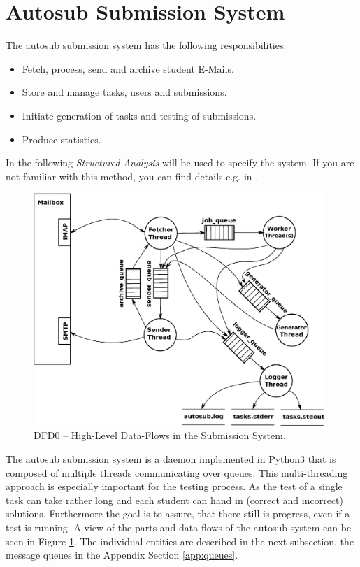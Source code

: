 \section{Autosub Submission System} \label{autosub_system}

The autosub submission system has the following responsibilities:
\begin{itemize}
    \item Fetch, process, send and archive student E-Mails.
    \item Store and manage tasks, users and submissions.
    \item Initiate generation of tasks and testing of submissions.
    \item Produce statistics.
\end{itemize}

In the following {\it Structured Analysis} will be used to specify the
system. If you are not familiar with this method, you can find details e.g. in
\cite{demarco, gooma, cooling}.

\begin{figure}[h!]
    \begin{center}
    \includegraphics[width=11cm]{images/autosub_structure.eps}
    \caption{DFD0 -- High-Level Data-Flows in the Submission System.}
    \label{fig:dfd0}
    \end{center}
\end{figure}

The autosub submission system is a daemon implemented in Python3 that is 
composed of multiple threads communicating over queues. This multi-threading 
approach is especially important for the testing process. As the test of a single
task can take rather long and each student can hand in (correct and incorrect) 
solutions. Furthermore the goal is to assure, that there still is progress, even 
if a test is running. A view of the parts and data-flows of the autosub system can 
be seen in Figure \ref{fig:dfd0}. The individual entities are described in the next subsection,
the message queues in the Appendix Section \ref{app:queues}.

